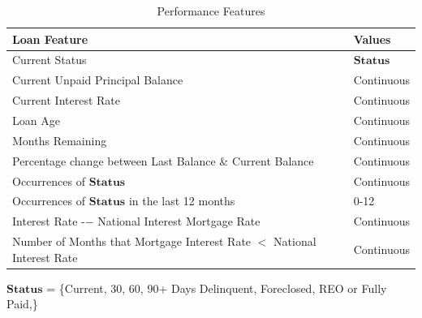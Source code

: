             \begin{center}
                \begin{table}[H]
                    \centering
                    \begin{tabular}{|p{11.5cm}|p{2.5cm}|}
                        \hline \textbf{Loan Feature} & \textbf{Values} \\ \hline \hline
                        Current Status & $\textbf{Status}$ \\ \hline  
                        Current Unpaid Principal Balance & Continuous \\ \hline  
                        Current Interest Rate & Continuous \\ \hline  
                        Loan Age & Continuous \\ \hline  
                        Months Remaining & Continuous \\ \hline  
                        Percentage change between Last Balance \& Current Balance & Continuous \\ \hline   
                        Occurrences of $\textbf{Status}$  & Continuous \\ \hline
                        Occurrences of $\textbf{Status}$ in the last 12 months  & 0-12 \\ \hline
                        Interest Rate -− National Interest Mortgage Rate  & Continuous \\ \hline
                        Number of Months that Mortgage Interest Rate $<$ National Interest Rate  & Continuous \\ \hline 
                    \end{tabular}
                    
                    \vspace*{0.2cm}
                
                    {\footnotesize $\textbf{Status}$ = \{Current, 30, 60, 90+ Days Delinquent, Foreclosed, REO or Fully Paid,\}}
                
                    \caption{Performance Features} \vspace{0.5cm}
                    \label{4: Monthly_update_features}
                \end{table}
            
                
            \end{center}
            
